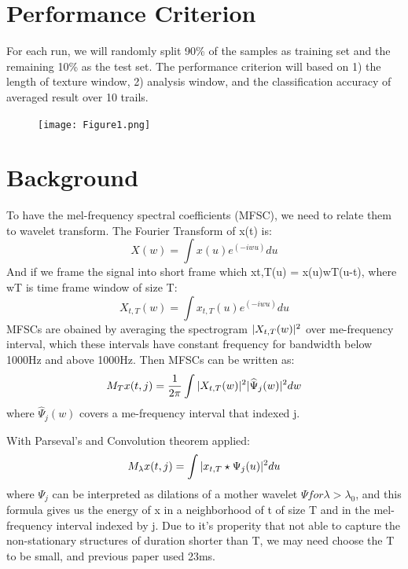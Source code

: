 \documentclass[final]{siamltexmm}
\begin{document}
\section{Performance Criterion}
For each run, we will randomly split 90\% of the samples as training set and the remaining 10\% as the test set. The performance criterion will based on 1) the length of texture window, 2) analysis window, and the classification accuracy of averaged result over 10 trails.

\begin{figure}[ht]
\begin{center}
  \texttt{[image: Figure1.png]}
\end{center}
\end{figure}

\section{Background}
To have the mel-frequency spectral coefficients (MFSC), we need to relate them to wavelet transform. The Fourier Transform of x(t) is:
\begin{equation}
X(w)=\int x(u)e^{(-iwu)}du\label{eq1}
\end{equation}
And if we frame the signal into short frame which xt,T(u) = x(u)wT(u-t), where wT is time frame window of size T:
\begin{equation}
X_{t,T}(w)=\int x_{t,T}(u)e^(-iwu)du\label{eq2}
\end{equation}
MFSCs are obained by averaging the spectrogram $\arrowvert X_{t,T}(w)\arrowvert^{2}$ over me-frequency interval, which these intervals have constant frequency for bandwidth below 1000Hz and above 1000Hz. Then MFSCs can be written as:
\begin{equation}
M_{T}x(t,j)=\frac{1}{2\pi} \int \arrowvert X_{t,T}(w)\arrowvert^{2} \arrowvert \widehat{\Psi}_{j}(w) \arrowvert^{2} dw\label{eq3}
\end{equation}
where $\widehat{\Psi}_{j}(w)$ covers a me-frequency interval that indexed j.

With Parseval’s and Convolution theorem  applied:
\begin{equation}
M_{\lambda}x(t,j)=\int \arrowvert x_{t,T} \star \Psi_{j}(u) \arrowvert^{2} du\label{eq4}
\end{equation}
where $\Psi_{j}$ can be interpreted as dilations of a mother wavelet $\Psi for \lambda > \lambda_{0}$, and this formula gives us the energy of x in a neighborhood of t of size T and in the mel-frequency interval indexed by j. Due to it’s properity that not able to capture the non-stationary structures of duration shorter than T, we may need choose the T to be small, and previous paper used 23ms.
\end{document}
